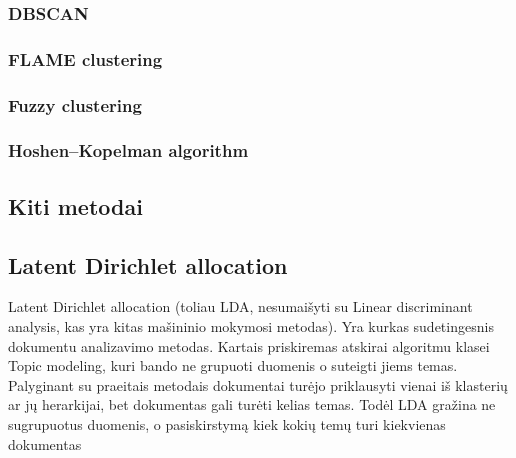 \documentclass[draft]{VUMIFInfKursinis}
\begin{document}
\subsubsection{DBSCAN}
\subsubsection{FLAME clustering}
\subsubsection{Fuzzy clustering}
\subsubsection{Hoshen–Kopelman algorithm}

\subsection{Kiti metodai}
\subsection{Latent Dirichlet allocation}
Latent Dirichlet allocation (toliau LDA, nesumaišyti su Linear discriminant analysis, kas yra kitas mašininio mokymosi metodas). Yra kurkas sudetingesnis dokumentu analizavimo metodas. Kartais priskiremas atskirai algoritmu klasei Topic modeling, kuri bando ne grupuoti duomenis o suteigti jiems temas. Palyginant su praeitais metodais dokumentai turėjo priklausyti vienai iš klasterių ar jų herarkijai, bet dokumentas gali turėti kelias temas. 
Todėl LDA gražina ne sugrupuotus duomenis, o pasiskirstymą kiek kokių temų turi kiekvienas dokumentas  
\end{document}
